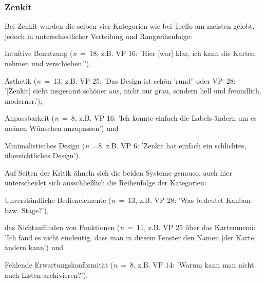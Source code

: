 \subsubsection{Zenkit}
Bei Zenkit wurden die selben vier Kategorien wie bei Trello am meisten gelobt, jedoch in unterschiedlicher Verteilung und Rangreihenfolge: 
\begin{seriate}
    \item Intuitive Benutzung (\textit{n}~=~18, z.B. VP 16: 'Hier [war] klar, ich kann die Karten nehmen und verschieben.”), 
    \item Ästhetik (\textit{n}~=~13, z.B. VP 25: 'Das Design ist schön 'rund'' oder VP~28: '[Zenkit] sieht insgesamt schöner aus, nicht nur grau, sondern hell und freundlich, moderner.'), 
    \item Anpassbarkeit (\textit{n}~=~8, z.B. VP 16: 'Ich konnte einfach die Labels ändern um es meinen Wünschen anzupassen') und
    \item Minimalistisches Design (\textit{n}~=8, z.B. VP 6: 'Zenkit hat einfach ein schlichtes, übersichtliches Design'). 
\end{seriate}



Auf Seiten der Kritik ähneln sich die beiden Systeme genauso, auch hier unterscheidet sich ausschließlich die Reihenfolge der Kategorien:
\begin{seriate}
    \item Unverständliche Bedienelemente (\textit{n}~=~13, z.B. VP 28: 'Was bedeutet Kanban bzw. Stage?'),
    \item das Nichtauffinden von Funktionen (\textit{n}~=~11, z.B. VP 25 über das Kartenmenü: 'Ich fand es nicht eindeutig, dass man in diesem Fenster den Namen [der Karte] ändern kann') und
    \item Fehlende Erwartungskonformität (\textit{n}~=~8, z.B. VP 14: 'Warum kann man nicht auch Listen archivieren?'). 
\end{seriate}{}